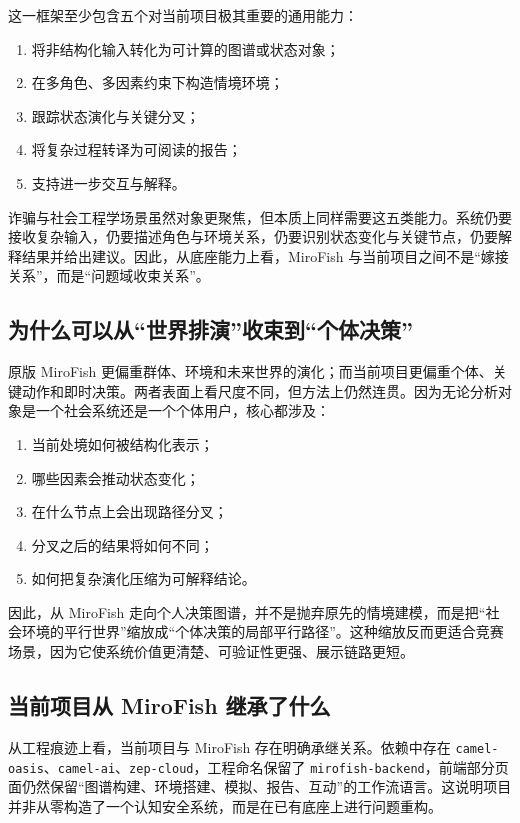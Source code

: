 \documentclass[12pt,a4paper]{ctexart}
\begin{document}
这一框架至少包含五个对当前项目极其重要的通用能力：
\begin{enumerate}[leftmargin=2em]
  \item 将非结构化输入转化为可计算的图谱或状态对象；
  \item 在多角色、多因素约束下构造情境环境；
  \item 跟踪状态演化与关键分叉；
  \item 将复杂过程转译为可阅读的报告；
  \item 支持进一步交互与解释。
\end{enumerate}

诈骗与社会工程学场景虽然对象更聚焦，但本质上同样需要这五类能力。系统仍要接收复杂输入，仍要描述角色与环境关系，仍要识别状态变化与关键节点，仍要解释结果并给出建议。因此，从底座能力上看，MiroFish 与当前项目之间不是“嫁接关系”，而是“问题域收束关系”。

\subsection{为什么可以从“世界排演”收束到“个体决策”}

原版 MiroFish 更偏重群体、环境和未来世界的演化；而当前项目更偏重个体、关键动作和即时决策。两者表面上看尺度不同，但方法上仍然连贯。因为无论分析对象是一个社会系统还是一个个体用户，核心都涉及：
\begin{enumerate}[leftmargin=2em]
  \item 当前处境如何被结构化表示；
  \item 哪些因素会推动状态变化；
  \item 在什么节点上会出现路径分叉；
  \item 分叉之后的结果将如何不同；
  \item 如何把复杂演化压缩为可解释结论。
\end{enumerate}

因此，从 MiroFish 走向个人决策图谱，并不是抛弃原先的情境建模，而是把“社会环境的平行世界”缩放成“个体决策的局部平行路径”。这种缩放反而更适合竞赛场景，因为它使系统价值更清楚、可验证性更强、展示链路更短。

\subsection{当前项目从 MiroFish 继承了什么}

从工程痕迹上看，当前项目与 MiroFish 存在明确承继关系。依赖中存在 \texttt{camel-oasis}、\texttt{camel-ai}、\texttt{zep-cloud}，工程命名保留了 \texttt{mirofish-backend}，前端部分页面仍然保留“图谱构建、环境搭建、模拟、报告、互动”的工作流语言。这说明项目并非从零构造了一个认知安全系统，而是在已有底座上进行问题重构。
\end{document}
